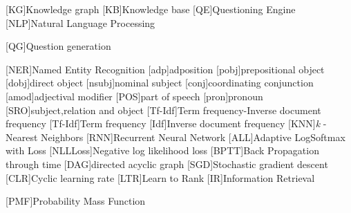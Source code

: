 

\begin{acronym}
[KG]{Knowledge graph}
[KB]{Knowledge base}
[QE]{Questioning Engine}
[NLP]{Natural Language Processing}

[QG]{Question generation}

[NER]{Named Entity Recognition}
[adp]{adposition}
[pobj]{prepositional object}
[dobj]{direct object}
[nsubj]{nominal subject}
[conj]{coordinating conjunction}
[amod]{adjectival modifier}
[POS]{part of speech}
[pron]{pronoun}
[SRO]{subject,relation and object}
[Tf-Idf]{Term frequency-Inverse document frequency}
[Tf-Idf]{Term frequency}
[Idf]{Inverse document frequency}
[KNN]{\textit{k} -Nearest Neighbors}
[RNN]{Recurrent Neural Network}
[ALL]{Adaptive LogSoftmax with Loss}
[NLLLoss]{Negative log likelihood loss}
[BPTT]{Back Propagation through time}
[DAG]{directed acyclic graph }
[SGD]{Stochastic gradient descent }
[CLR]{Cyclic learning rate }
[LTR]{Learn to Rank }
[IR]{Information Retrieval }

[PMF]{Probability Mass Function }
\end{acronym}

